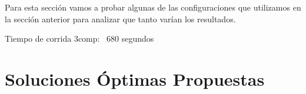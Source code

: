 Para esta sección vamos a probar algunas de las configuraciones que utilizamos en la sección anterior para analizar que tanto varían los resultados.

Tiempo de corrida 3comp: ~680 segundos

\newpage
\section{Soluciones Óptimas Propuestas}










